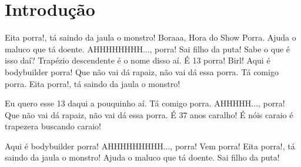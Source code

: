 \section{Introdução}
    
        Eita porra!, tá saindo da jaula o monstro! Boraaa, Hora do Show Porra. Ajuda o maluco que tá doente. AHHHHHHHH..., porra! Sai filho da puta! Sabe o que é isso daí? Trapézio descendente é o nome disso aí. É 13 porra! Birl! Aqui é bodybuilder porra! Que não vai dá rapaiz, não vai dá essa porra. Tá comigo porra. Eita porra!, tá saindo da jaula o monstro!
        
        Eu quero esse 13 daqui a pouquinho aí. Tá comigo porra. AHHHHH..., porra! Que não vai dá rapaiz, não vai dá essa porra. É 37 anos caralho! É nóis caraio é trapezera buscando caraio!
        
        Aqui é bodybuilder porra! AHHHHHHHHH..., porra! Vem porra! Eita porra!, tá saindo da jaula o monstro! Ajuda o maluco que tá doente. Sai filho da puta!